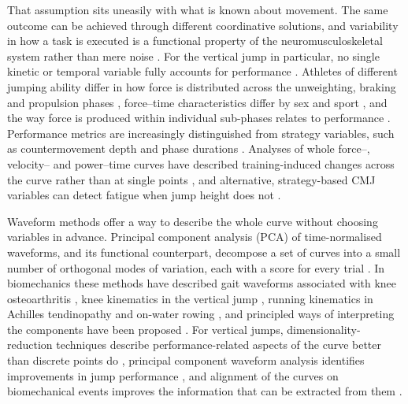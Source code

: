 That assumption sits uneasily with what is known about movement. The same outcome can be achieved through different coordinative solutions, and variability in how a task is executed is a functional property of the neuromusculoskeletal system rather than mere noise \citep{davids2003,bartlett2007,preatoni2013}. For the vertical jump in particular, no single kinetic or temporal variable fully accounts for performance \citep{dowling1993}. Athletes of different jumping ability differ in how force is distributed across the unweighting, braking and propulsion phases \citep{sole2018}, force--time characteristics differ by sex and sport \citep{laffaye2014}, and the way force is produced within individual sub-phases relates to performance \citep{harry2018}. Performance metrics are increasingly distinguished from strategy variables, such as countermovement depth and phase durations \citep{harry2024}. Analyses of whole force--, velocity-- and power--time curves have described training-induced changes across the curve rather than at single points \citep{cormie2009}, and alternative, strategy-based CMJ variables can detect fatigue when jump height does not \citep{gathercole2015}.

Waveform methods offer a way to describe the whole curve without choosing variables in advance. Principal component analysis (PCA) of time-normalised waveforms, and its functional counterpart, decompose a set of curves into a small number of orthogonal modes of variation, each with a score for every trial \citep{jolliffe2002,ramsay2005,jolliffe2016}. In biomechanics these methods have described gait waveforms associated with knee osteoarthritis \citep{deluzio2007}, knee kinematics in the vertical jump \citep{ryan2006}, running kinematics in Achilles tendinopathy \citep{donoghue2008} and on-water rowing \citep{warmenhoven2019}, and principled ways of interpreting the components have been proposed \citep{brandon2013}. For vertical jumps, dimensionality-reduction techniques describe performance-related aspects of the curve better than discrete points do \citep{richter2014b}, principal component waveform analysis identifies improvements in jump performance \citep{floria2019}, and alignment of the curves on biomechanical events improves the information that can be extracted from them \citep{richter2014a,moudy2018}.

